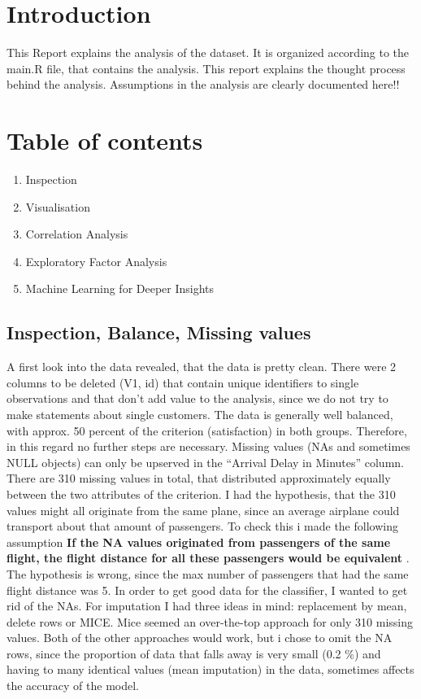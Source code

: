 \documentclass[
]{article}
\providecommand{\tightlist}{%
  \setlength{\itemsep}{0pt}\setlength{\parskip}{0pt}}
\begin{document}
\hypertarget{introduction}{%
\section{Introduction}\label{introduction}}

This Report explains the analysis of the dataset. It is organized
according to the main.R file, that contains the analysis. This report
explains the thought process behind the analysis. Assumptions in the
analysis are clearly documented here!!

\hypertarget{table-of-contents}{%
\section{Table of contents}\label{table-of-contents}}

\begin{enumerate}
\def\labelenumi{\arabic{enumi}.}
\tightlist
\item
  Inspection
\item
  Visualisation
\item
  Correlation Analysis
\item
  Exploratory Factor Analysis
\item
  Machine Learning for Deeper Insights
\end{enumerate}

\hypertarget{inspection-balance-missing-values}{%
\subsection{Inspection, Balance, Missing
values}\label{inspection-balance-missing-values}}

A first look into the data revealed, that the data is pretty clean.
There were 2 columns to be deleted (V1, id) that contain unique
identifiers to single observations and that don't add value to the
analysis, since we do not try to make statements about single customers.
The data is generally well balanced, with approx. 50 percent of the
criterion (satisfaction) in both groups. Therefore, in this regard no
further steps are necessary. Missing values (NAs and sometimes NULL
objects) can only be upserved in the ``Arrival Delay in Minutes''
column. There are 310 missing values in total, that distributed
approximately equally between the two attributes of the criterion. I had
the hypothesis, that the 310 values might all originate from the same
plane, since an average airplane could transport about that amount of
passengers. To check this i made the following assumption \textbf{If the
NA values originated from passengers of the same flight, the flight
distance for all these passengers would be equivalent }. The hypothesis
is wrong, since the max number of passengers that had the same flight
distance was 5. In order to get good data for the classifier, I wanted
to get rid of the NAs. For imputation I had three ideas in mind:
replacement by mean, delete rows or MICE. Mice seemed an over-the-top
approach for only 310 missing values. Both of the other approaches would
work, but i chose to omit the NA rows, since the proportion of data that
falls away is very small (0.2 \%) and having to many identical values
(mean imputation) in the data, sometimes affects the accuracy of the
model.
\end{document}

